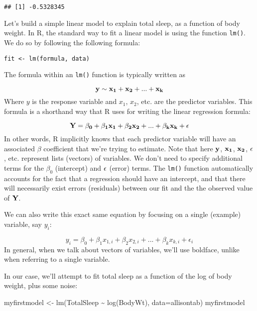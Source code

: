 \documentclass[
]{book}
\newenvironment{Shaded}{\begin{snugshade}}{\end{snugshade}}
\newcommand{\AttributeTok}[1]{\textcolor[rgb]{0.77,0.63,0.00}{#1}}
\newcommand{\FunctionTok}[1]{\textcolor[rgb]{0.00,0.00,0.00}{#1}}
\newcommand{\NormalTok}[1]{#1}
\newcommand{\OtherTok}[1]{\textcolor[rgb]{0.56,0.35,0.01}{#1}}
\newcommand{\SpecialCharTok}[1]{\textcolor[rgb]{0.00,0.00,0.00}{#1}}
\begin{document}
\begin{verbatim}
## [1] -0.5328345
\end{verbatim}

Let's build a simple linear model to explain total sleep, as a function of body weight. In R, the standard way to fit a linear model is using the function \texttt{lm()}. We do so by following the following formula:

\texttt{fit\ \textless{}-\ lm(formula,\ data)}

The formula within an \texttt{lm()} function is typically written as

\[\bf{y} \sim \bf{x_1} + \bf{x_2} + ... + \bf{x_k}\]
Where \(y\) is the response variable and \(x_1\), \(x_2\), etc. are the predictor variables. This formula is a shorthand way that R uses for writing the linear regression formula:

\[\bf{Y} = \beta_0 + \beta_1 \bf{x_1} + \beta_2 \bf{x_2} + ... + \beta_k \bf{x_k} + \bf{\epsilon}\]
In other words, R implicitly knows that each predictor variable will have an associated \(\beta\) coefficient that we're trying to estimate. Note that here \(\bf{y}\), \(\bf{x_1}\), \(\bf{x_2}\), \(\bf{\epsilon}\), etc. represent lists (vectors) of variables. We don't need to specify additional terms for the \(\beta_0\) (intercept) and \(\bf{\epsilon}\) (error) terms. The \texttt{lm()} function automatically accounts for the fact that a regression should have an intercept, and that there will necessarily exist errors (residuals) between our fit and the the observed value of \(\bf{Y}\).

We can also write this exact same equation by focusing on a single (example) variable, say \(y_i\):

\[y_i = \beta_0 + \beta_1 x_{1,i} + \beta_2 x_{2,i} + ... + \beta_k x_{k,i} + \epsilon_i\]
In general, when we talk about vectors of variables, we'll use boldface, unlike when referring to a single variable.

In our case, we'll attempt to fit total sleep as a function of the log of body weight, plus some noise:

\begin{Shaded}
\begin{Highlighting}[]
\NormalTok{myfirstmodel }\OtherTok{\textless{}{-}} \FunctionTok{lm}\NormalTok{(TotalSleep }\SpecialCharTok{\textasciitilde{}} \FunctionTok{log}\NormalTok{(BodyWt), }\AttributeTok{data=}\NormalTok{allisontab) }
\NormalTok{myfirstmodel}
\end{Highlighting}
\end{Shaded}
\end{document}
